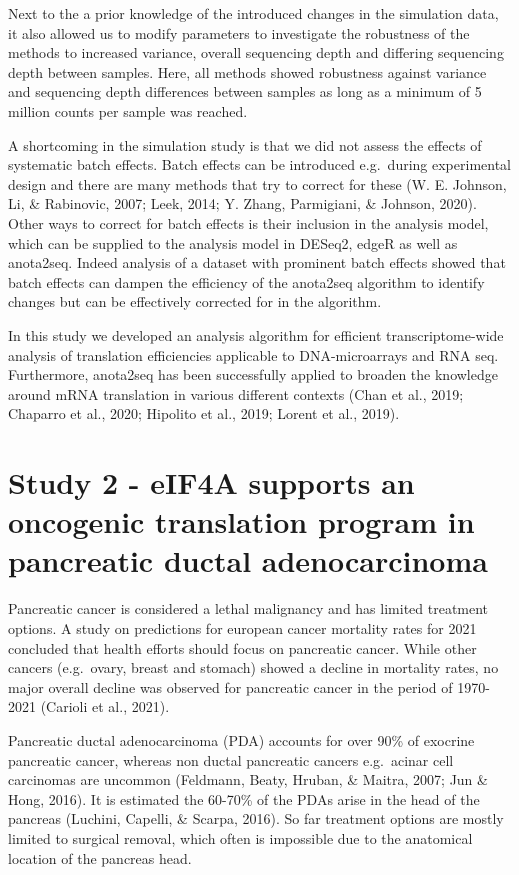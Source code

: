 \documentclass[12pt,openany]{book}
\begin{document}
Next to the a prior knowledge of the introduced changes in the
simulation data, it also allowed us to modify parameters to investigate
the robustness of the methods to increased variance, overall sequencing
depth and differing sequencing depth between samples. Here, all methods
showed robustness against variance and sequencing depth differences
between samples as long as a minimum of 5 million counts per sample was
reached.

A shortcoming in the simulation study is that we did not assess the
effects of systematic batch effects. Batch effects can be introduced
e.g.~during experimental design and there are many methods that try to
correct for these (W. E. Johnson, Li, \& Rabinovic, 2007; Leek, 2014; Y.
Zhang, Parmigiani, \& Johnson, 2020). Other ways to correct for batch
effects is their inclusion in the analysis model, which can be supplied
to the analysis model in DESeq2, edgeR as well as anota2seq. Indeed
analysis of a dataset with prominent batch effects showed that batch
effects can dampen the efficiency of the anota2seq algorithm to identify
changes but can be effectively corrected for in the algorithm.

In this study we developed an analysis algorithm for efficient
transcriptome-wide analysis of translation efficiencies applicable to
DNA-microarrays and RNA seq. Furthermore, anota2seq has been
successfully applied to broaden the knowledge around mRNA translation in
various different contexts (Chan et al., 2019; Chaparro et al., 2020;
Hipolito et al., 2019; Lorent et al., 2019). \newline
\section{Study 2 - eIF4A supports an oncogenic translation program in pancreatic ductal adenocarcinoma}

Pancreatic cancer is considered a lethal malignancy and has limited
treatment options. A study on predictions for european cancer mortality
rates for 2021 concluded that health efforts should focus on pancreatic
cancer. While other cancers (e.g.~ovary, breast and stomach) showed a
decline in mortality rates, no major overall decline was observed for
pancreatic cancer in the period of 1970-2021 (Carioli et al., 2021).

Pancreatic ductal adenocarcinoma (PDA) accounts for over 90\% of
exocrine pancreatic cancer, whereas non ductal pancreatic cancers
e.g.~acinar cell carcinomas are uncommon (Feldmann, Beaty, Hruban, \&
Maitra, 2007; Jun \& Hong, 2016). It is estimated the 60-70\% of the
PDAs arise in the head of the pancreas (Luchini, Capelli, \& Scarpa,
2016). So far treatment options are mostly limited to surgical removal,
which often is impossible due to the anatomical location of the pancreas
head.
\end{document}
